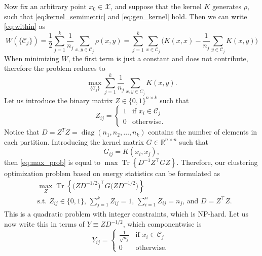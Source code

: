 \documentclass{article}
\DeclareMathOperator{\diag}{diag}
\DeclareMathOperator{\Tr}{Tr}
\newcommand\kk{K}
\newcommand\C{{\mathcal{C}}}
\newcommand\Zt{Y}
\begin{document}
Now fix an arbitrary point $x_0 \in \mathcal{X}$, and 
suppose that the kernel $K$ generates $\rho$, such that 
\eqref{eq:kernel_semimetric} and \eqref{eq:gen_kernel} hold.
Then we can write \eqref{eq:within} as
\begin{equation}\label{eq:W2}
W(\{ \C_j \} )
= \dfrac{1}{2} \sum_{j=1}^k \dfrac{1}{n_j} \sum_{x,y \in \C_j} \rho(x,y)
= \sum_{j=1}^k \sum_{x \in \C_j}  \bigg(
\kk(x,x) - \dfrac{1}{n_j} \sum_{y \in \C_j} \kk(x,y) \bigg)
\end{equation}
When minimizing $W$, the first term is just a constant and does
not contribute,
therefore the problem reduces to
\begin{equation}
\label{eq:max_prob}
\max_{ \{ \C_j \} } \sum_{j=1}^k \dfrac{1}{n_j} \sum_{x,y\in C_j} \kk(x,y) .
\end{equation}
Let us introduce the binary matrix $Z \in \{ 0,1 \}^{n\times k}$ 
such that 
\begin{equation}
Z_{ij} = \begin{cases}
1 & \mbox{if $x_i \in \C_j$ } \\
0 & \mbox{otherwise.}
\end{cases}
\end{equation}
Notice that $D = Z^T Z = \diag( n_1, n_2, \dotsc, n_k )$ contains the number
of elements in each partition. Introducing the kernel matrix
$G \in \mathbb{R}^{n\times n}$ such that
\begin{equation}
\label{eq:kernel_matrix}
G_{ij} = \kk(x_i, x_j),
\end{equation}
then \eqref{eq:max_prob} is equal to
$\max \Tr \left\{ D^{-1} Z^\top G Z \right\}$. 
Therefore, our clustering optimization problem based on energy statistics
can be formulated as
\begin{equation}\label{eq:qcqp}
\begin{aligned}
& \max_{Z} \Tr\left\{ \big( Z D^{-1/2}\big)^\top G 
\big( ZD^{-1/2} \big) 
\right\} \\
&\mbox{s.t. $Z_{ij} \in \{0,1\}$, $\sum_{j=1}^k Z_{ij} = 1$, 
$\sum_{i=1}^n Z_{ij} = n_j$, and $D = Z^\top Z$}.
\end{aligned}
\end{equation}
This is a quadratic problem with integer constraints, which is 
NP-hard. Let us now write this in terms of 
$\Zt \equiv Z D^{-1/2}$, which componentwise is 
\begin{equation}
\Zt_{ij} = \begin{cases}
\tfrac{1}{\sqrt{n_j}} & \mbox{if $x_i \in \C_j$ } \\
0 & \mbox{otherwise.}
\end{cases}
\end{equation}
\end{document}
